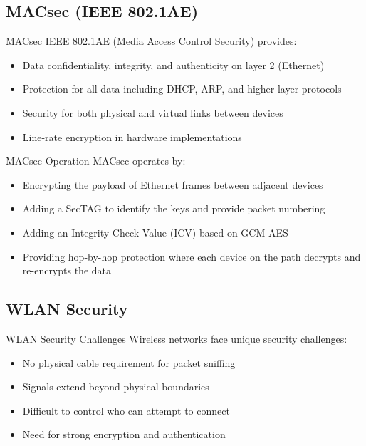 \subsection{MACsec (IEEE 802.1AE)}

\begin{definition}{MACsec}
IEEE 802.1AE (Media Access Control Security) provides:
\begin{itemize}
    \item Data confidentiality, integrity, and authenticity on layer 2 (Ethernet)
    \item Protection for all data including DHCP, ARP, and higher layer protocols
    \item Security for both physical and virtual links between devices
    \item Line-rate encryption in hardware implementations
\end{itemize}
\end{definition}

\begin{concept}{MACsec Operation}
MACsec operates by:
\begin{itemize}
    \item Encrypting the payload of Ethernet frames between adjacent devices
    \item Adding a SecTAG to identify the keys and provide packet numbering
    \item Adding an Integrity Check Value (ICV) based on GCM-AES
    \item Providing hop-by-hop protection where each device on the path decrypts and re-encrypts the data
\end{itemize}
\end{concept}

\subsection{WLAN Security}

\begin{definition}{WLAN Security Challenges}
Wireless networks face unique security challenges:
\begin{itemize}
    \item No physical cable requirement for packet sniffing
    \item Signals extend beyond physical boundaries
    \item Difficult to control who can attempt to connect
    \item Need for strong encryption and authentication
\end{itemize}
\end{definition}

